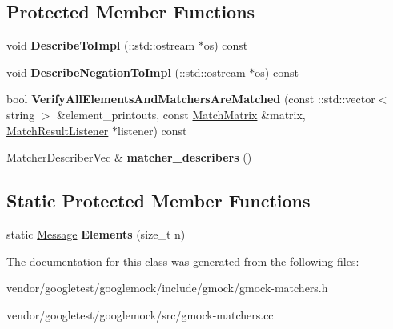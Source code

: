 \subsection*{Protected Member Functions}
\begin{DoxyCompactItemize}
\item 
\mbox{\label{classtesting_1_1internal_1_1_unordered_elements_are_matcher_impl_base_a40318adf9a89d830a26a96b2eb06b4e3}} 
void {\bfseries Describe\+To\+Impl} (\+::std\+::ostream $\ast$os) const
\item 
\mbox{\label{classtesting_1_1internal_1_1_unordered_elements_are_matcher_impl_base_ab3ca5ae4aef146b093a3fb35f53d1a38}} 
void {\bfseries Describe\+Negation\+To\+Impl} (\+::std\+::ostream $\ast$os) const
\item 
\mbox{\label{classtesting_1_1internal_1_1_unordered_elements_are_matcher_impl_base_a515ec900bd84fe4d28e3ccf55db25822}} 
bool {\bfseries Verify\+All\+Elements\+And\+Matchers\+Are\+Matched} (const \+::std\+::vector$<$ string $>$ \&element\+\_\+printouts, const \hyperlink{classtesting_1_1internal_1_1_match_matrix}{Match\+Matrix} \&matrix, \hyperlink{classtesting_1_1_match_result_listener}{Match\+Result\+Listener} $\ast$listener) const
\item 
\mbox{\label{classtesting_1_1internal_1_1_unordered_elements_are_matcher_impl_base_a04d4adc809d9c06331f8dbb67b879ac0}} 
Matcher\+Describer\+Vec \& {\bfseries matcher\+\_\+describers} ()
\end{DoxyCompactItemize}
\subsection*{Static Protected Member Functions}
\begin{DoxyCompactItemize}
\item 
\mbox{\label{classtesting_1_1internal_1_1_unordered_elements_are_matcher_impl_base_ab6d5a2342e07730b913f419cf662d16a}} 
static \hyperlink{classtesting_1_1_message}{Message} {\bfseries Elements} (size\+\_\+t n)
\end{DoxyCompactItemize}


The documentation for this class was generated from the following files\+:\begin{DoxyCompactItemize}
\item 
vendor/googletest/googlemock/include/gmock/gmock-\/matchers.\+h\item 
vendor/googletest/googlemock/src/gmock-\/matchers.\+cc\end{DoxyCompactItemize}
